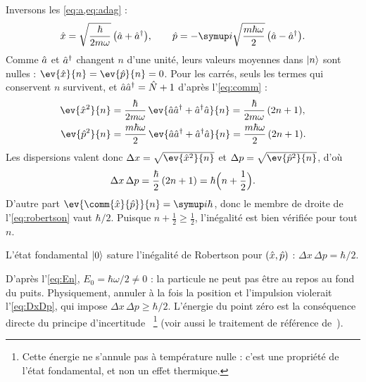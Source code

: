 \begin{solution}
  Inversons les \cref{eq:a,eq:adag} :
  \begin{equation}
    \op{x}=\sqrt{\frac{\hbar}{2m\omega}}\,\bigl(\op{a}+\op{a}\adj\bigr),
    \qquad
    \op{p}=-\ii\sqrt{\frac{m\hbar\omega}{2}}\,\bigl(\op{a}-\op{a}\adj\bigr).
    \label{eq:xp}
  \end{equation}
  Comme $\hat{a}$ et $\hat{a}^{\dagger}$ changent $n$ d'une unité, leurs valeurs
  moyennes dans $\lvert n\rangle$ sont nulles : $\ev{\op{x}}{n}=\ev{\op{p}}{n}=0$.
  Pour les carrés, seuls les termes qui conservent $n$ survivent, et
  $\hat{a}\hat{a}^{\dagger}=\hat{N}+1$ d'après l'\cref{eq:comm} :
  \begin{align}
    \ev{\op{x}^{2}}{n}
      &=\frac{\hbar}{2m\omega}\,\ev{\op{a}\op{a}\adj+\op{a}\adj\op{a}}{n}
       =\frac{\hbar}{2m\omega}\,(2n+1),
    \label{eq:x2}\\
    \ev{\op{p}^{2}}{n}
      &=\frac{m\hbar\omega}{2}\,\ev{\op{a}\op{a}\adj+\op{a}\adj\op{a}}{n}
       =\frac{m\hbar\omega}{2}\,(2n+1).
    \label{eq:p2}
  \end{align}
  Les dispersions valent donc $\Delta x=\sqrt{\ev{\op{x}^{2}}{n}}$ et
  $\Delta p=\sqrt{\ev{\op{p}^{2}}{n}}$, d'où
  \begin{equation}
    \Delta x\,\Delta p=\frac{\hbar}{2}\,(2n+1)=\hbar\Bigl(n+\frac12\Bigr).
    \label{eq:DxDp}
  \end{equation}
  D'autre part $\ev{\comm{\op{x}}{\op{p}}}{n}=\ii\hbar$, donc le membre de
  droite de l'\cref{eq:robertson} vaut $\hbar/2$. Puisque $n+\tfrac12\geq\tfrac12$,
  l'inégalité est bien vérifiée pour tout $n$.
\end{solution}

\begin{corollaire}\label{cor:saturation}
  L'état fondamental $\lvert0\rangle$ sature l'inégalité de Robertson pour $(\hat{x},\hat{p})$ :
  $\Delta x\,\Delta p=\hbar/2$.
\end{corollaire}

\begin{remarque}\label{rem:zero}
  D'après l'\cref{eq:En}, $E_{0}=\hbar\omega/2\neq 0$ : la particule ne peut pas
  être au repos au fond du puits. Physiquement, annuler à la fois la
  position et l'impulsion violerait l'\cref{eq:DxDp}, qui impose
  $\Delta x\,\Delta p\geq\hbar/2$. L'énergie du point zéro est la
  conséquence directe du principe d'incertitude~\cite{heisenberg1927,robertson1929}%
  \footnote{Cette énergie ne s'annule pas à température nulle : c'est une propriété de
  l'état fondamental, et non un effet thermique.}
  (voir aussi le traitement de référence de~\cite{griffiths2018,cohen1973}).
\end{remarque}

